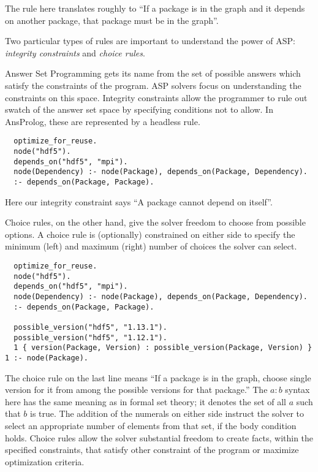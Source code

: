 The rule here translates roughly to ``If a package is in the graph and it depends on another package, that package must be in the graph''.

Two particular types of rules are important to understand the power of ASP: \textit{integrity constraints} and \textit{choice rules}.

Answer Set Programming gets its name from the set of possible answers which satisfy the constraints of the program.
ASP solvers focus on understanding the constraints on this space.
Integrity constraints allow the programmer to rule out swatch of the answer set space by specifying conditions not to allow.
In AnsProlog, these are represented by a headless rule.

\begin{verbatim}
  optimize_for_reuse.
  node("hdf5").
  depends_on("hdf5", "mpi").
  node(Dependency) :- node(Package), depends_on(Package, Dependency).
  :- depends_on(Package, Package).
\end{verbatim}

Here our integrity constraint says ``A package cannot depend on itself''.

Choice rules, on the other hand, give the solver freedom to choose from possible options.
A choice rule is (optionally) constrained on either side to specify the minimum (left) and maximum (right) number of choices the solver can select.

\begin{verbatim}
  optimize_for_reuse.
  node("hdf5").
  depends_on("hdf5", "mpi").
  node(Dependency) :- node(Package), depends_on(Package, Dependency).
  :- depends_on(Package, Package).

  possible_version("hdf5", "1.13.1").
  possible_version("hdf5", "1.12.1").
  1 { version(Package, Version) : possible_version(Package, Version) } 1 :- node(Package).
\end{verbatim}

The choice rule on the last line means ``If a package is in the graph, choose single version for it from among the possible versions for that package.''
The ${a:b}$ syntax here has the same meaning as in formal set theory; it denotes the set of all $a$ such that $b$ is true.
The addition of the numerals on either side instruct the solver to select an appropriate number of elements from that set, if the body condition holds.
Choice rules allow the solver substantial freedom to create facts, within the specified constraints, that satisfy other constraint of the program or maximize optimization criteria.

